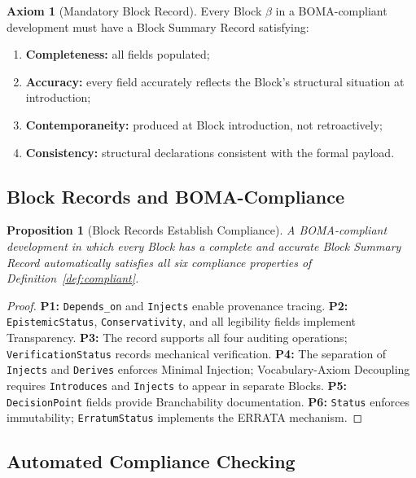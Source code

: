 \documentclass[12pt, a4paper]{article}
\theoremstyle{plain}
\newtheorem{proposition}[theorem]{Proposition}
\theoremstyle{definition}
\newtheorem{axiom}[theorem]{Axiom}
\theoremstyle{remark}
\newcommand{\BOMA}{\textsf{BOMA}}
\begin{document}
\begin{axiom}[Mandatory Block Record]
\label{ax:record}
Every Block $\beta$ in a \BOMA{}-compliant development must have a
Block Summary Record satisfying:
\begin{enumerate}
  \item \textbf{Completeness:} all fields populated;
  \item \textbf{Accuracy:} every field accurately reflects the
        Block's structural situation at introduction;
  \item \textbf{Contemporaneity:} produced at Block introduction,
        not retroactively;
  \item \textbf{Consistency:} structural declarations consistent
        with the formal payload.
\end{enumerate}
\end{axiom}

\subsection{Block Records and BOMA-Compliance}
\label{subsec:record-compliance}

\begin{proposition}[Block Records Establish Compliance]
\label{prop:record-compliance}
A \BOMA{}-compliant development in which every Block has a complete
and accurate Block Summary Record automatically satisfies all six
compliance properties of Definition~\ref{def:compliant}.
\end{proposition}

\begin{proof}
\textbf{P1:} \texttt{Depends\_on} and \texttt{Injects} enable
provenance tracing.
\textbf{P2:} \texttt{Epistemic\-Status}, \texttt{Conservativity}, and
all legibility fields implement Transparency.
\textbf{P3:} The record supports all four auditing operations;
\texttt{Verification\-Status} records mechanical verification.
\textbf{P4:} The separation of \texttt{Injects} and \texttt{Derives}
enforces Minimal Injection; Vocabulary-Axiom Decoupling requires
\texttt{Introduces} and \texttt{Injects} to appear in separate Blocks.
\textbf{P5:} \texttt{Decision\-Point} fields provide Branchability
documentation.
\textbf{P6:} \texttt{Status} enforces immutability;
\texttt{Erratum\-Status} implements the ERRATA mechanism.
\end{proof}

\subsection{Automated Compliance Checking}
\label{subsec:checker}
\end{document}
